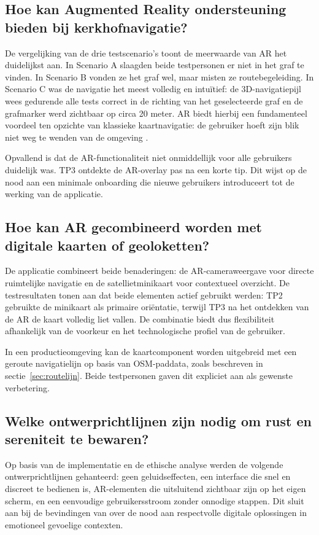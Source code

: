 \subsection{Hoe kan Augmented Reality ondersteuning bieden bij kerkhofnavigatie?}

De vergelijking van de drie testscenario's toont de meerwaarde van AR het
duidelijkst aan. In Scenario A slaagden beide testpersonen er niet in het
graf te vinden. In Scenario B vonden ze het graf wel, maar misten ze
routebegeleiding. In Scenario C was de navigatie het meest volledig en
intuïtief: de 3D-navigatiepijl wees gedurende alle tests correct in de
richting van het geselecteerde graf en de grafmarker werd zichtbaar op circa
20 meter. AR biedt hierbij een fundamenteel voordeel ten opzichte van
klassieke kaartnavigatie: de gebruiker hoeft zijn blik niet weg te wenden
van de omgeving \autocite{Zhao2025}.

Opvallend is dat de AR-functionaliteit niet onmiddellijk voor alle
gebruikers duidelijk was. TP3 ontdekte de AR-overlay pas na een korte tip.
Dit wijst op de nood aan een minimale onboarding die nieuwe gebruikers
introduceert tot de werking van de applicatie.

\subsection{Hoe kan AR gecombineerd worden met digitale kaarten of geoloketten?}

De applicatie combineert beide benaderingen: de AR-cameraweergave voor directe
ruimtelijke navigatie en de satellietminikaart voor contextueel overzicht. De
testresultaten tonen aan dat beide elementen actief gebruikt werden: TP2 gebruikte
de minikaart als primaire oriëntatie, terwijl TP3 na het ontdekken van de AR
de kaart volledig liet vallen. De combinatie biedt dus flexibiliteit afhankelijk
van de voorkeur en het technologische profiel van de gebruiker.

In een productieomgeving kan de kaartcomponent worden uitgebreid met een geroute
navigatielijn op basis van OSM-paddata, zoals beschreven in
sectie~\ref{sec:routelijn}. Beide testpersonen gaven dit expliciet aan als
gewenste verbetering.

\subsection{Welke ontwerprichtlijnen zijn nodig om rust en sereniteit te bewaren?}

Op basis van de implementatie en de ethische analyse werden de volgende
ontwerprichtlijnen gehanteerd: geen geluidseffecten, een interface die snel
en discreet te bedienen is, AR-elementen die uitsluitend zichtbaar zijn op
het eigen scherm, en een eenvoudige gebruikersstroom zonder onnodige stappen.
Dit sluit aan bij de bevindingen van \autocite{Haekkilae2022} over de nood
aan respectvolle digitale oplossingen in emotioneel gevoelige contexten.

